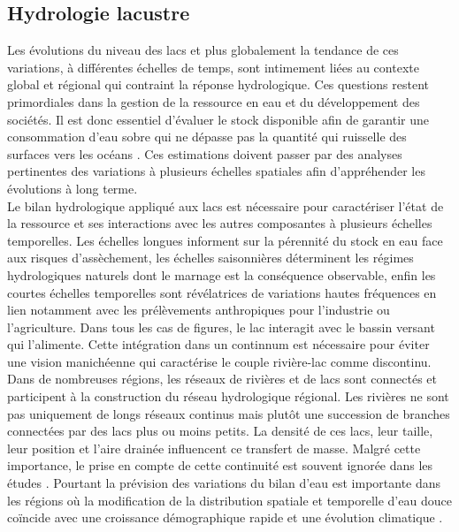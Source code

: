 \subsection{{\selectfont Hydrologie lacustre}}

Les évolutions du niveau des lacs et plus globalement la tendance de ces variations, à différentes échelles de temps, sont intimement liées au contexte global et régional qui contraint la réponse hydrologique. Ces questions restent primordiales dans la gestion de la ressource en eau et du développement des sociétés. Il est donc essentiel d'évaluer le stock disponible afin de garantir une consommation d'eau sobre qui ne dépasse pas la quantité qui ruisselle des surfaces vers les océans \citep{oki2006}. Ces estimations doivent passer par des analyses pertinentes des variations à plusieurs échelles spatiales afin d’appréhender les évolutions à long terme.\\

Le bilan hydrologique appliqué aux lacs est nécessaire pour caractériser l'état de la ressource et ses interactions avec les autres composantes à plusieurs échelles temporelles. Les échelles longues informent sur la pérennité du stock en eau face aux risques d'assèchement, les échelles saisonnières déterminent les régimes hydrologiques naturels dont le marnage est la conséquence observable, enfin les courtes échelles temporelles sont révélatrices de variations hautes fréquences en lien notamment avec les prélèvements anthropiques pour l'industrie ou l'agriculture. Dans tous les cas de figures, le lac interagit avec le bassin versant qui l'alimente. Cette intégration dans un continnum est nécessaire pour éviter une vision manichéenne qui caractérise le couple rivière-lac comme discontinu. \\
Dans de nombreuses régions, les réseaux de rivières et de lacs sont connectés \citep{kratz2000} et participent à la construction du réseau hydrologique régional. Les rivières ne sont pas uniquement de longs réseaux continus mais plutôt une succession de branches connectées par des lacs plus ou moins petits. La densité de ces lacs, leur taille, leur position et l'aire drainée influencent ce transfert de masse. Malgré cette importance, le prise en compte de cette continuité est souvent ignorée dans les études \citep{jones2010}. Pourtant la prévision des variations du bilan d'eau est importante dans les régions où la modification de la distribution spatiale et temporelle d'eau douce coïncide avec une croissance démographique rapide et une évolution climatique \citep{schewe2014}. \\

